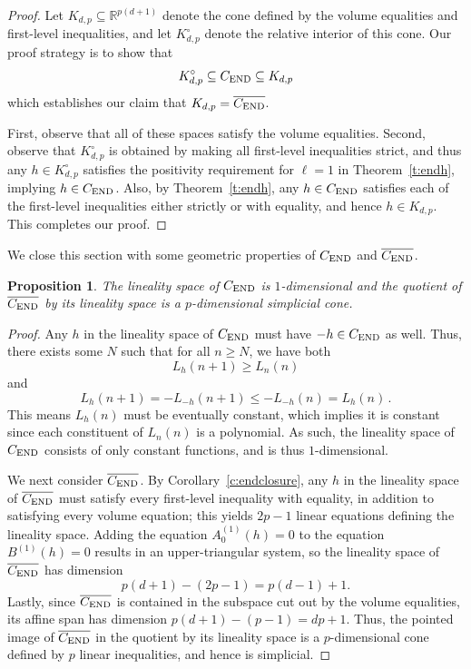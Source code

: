\documentclass[12pt]{amsart}
\newtheorem{prop}[thm]{Proposition}
\theoremstyle{definition}
\numberwithin{equation}{section}
\renewcommand\>{\rangle}
\newcommand\<{\langle}
\newcommand\0{\mathbf{0}}
\newcommand\RR{\mathbb{R}}
\begin{document}
\begin{proof}
Let $K_{d,p} \subseteq \RR^{p(d+1)}$ denote the cone defined by the volume equalities and first-level inequalities, and let $K_{d,p}^\circ$ denote the relative interior of this cone.
Our proof strategy is to show that 
\[
K_{d,p}^\circ \subseteq C_\textnormal{END} \subseteq K_{d,p}
\]
which establishes our claim that $K_{d,p} = \overline{C_\textnormal{END}}$.

First, observe that all of these spaces satisfy the volume equalities.
Second, observe that $K_{d,p}^\circ$ is obtained by making all first-level inequalities strict, and thus any $h\in K_{d,p}^\circ$ satisfies the positivity requirement for $\ell=1$ in Theorem~\ref{t:endh}, implying $h\in C_\textnormal{END}$.
Also, by Theorem~\ref{t:endh}, any $h \in C_\textnormal{END}$ satisfies each of the first-level inequalities either strictly or with equality, and hence $h\in K_{d,p}$.
This completes our proof.
\end{proof}

We close this section with some geometric properties of $C_\textnormal{END}$ and $\overline{C_\textnormal{END}}$.

\begin{prop}\label{prop:linealitydimensions}
The lineality space of $C_\textnormal{END}$ is $1$-dimensional and the quotient of $\overline{C_\textnormal{END}}$ by its lineality space is a $p$-dimensional simplicial cone.
\end{prop}

\begin{proof}
Any $h$ in the lineality space of $C_\textnormal{END}$ must have $-h \in C_\textnormal{END}$ as well.
Thus, there exists some $N$ such that for all $n\geq N$, we have both
\[
L_h(n+1)\geq L_n(n)
\]
and
\[
L_h(n+1)=-L_{-h}(n+1)\leq -L_{-h}(n) = L_{h}(n) \, .
\]
This means $L_h(n)$ must be eventually constant, which implies it is constant since each constituent of $L_n(n)$ is a polynomial.  
As such, the lineality space of $C_\textnormal{END}$ consists of only constant functions, and is thus $1$-dimensional. 

We next consider $\overline{C_\textnormal{END}}$.  
By Corollary~\ref{c:endclosure}, any $h$ in the lineality space of $\overline{C_\textnormal{END}}$ must satisfy every first-level inequality with equality, in addition to satisfying every volume equation; this yields $2p - 1$ linear equations defining the lineality space.  
Adding the equation $A_0^{(1)}(h) = 0$ to the equation $B^{(1)}(h) = 0$ results in an upper-triangular system, so the lineality space of $\overline{C_\textnormal{END}}$ has dimension 
$$p(d+1) - (2p - 1) = p(d-1) + 1.$$
Lastly, since $\overline{C_\textnormal{END}}$ is contained in the subspace cut out by the volume equalities, its affine span has dimension $p(d+1) - (p-1) = dp + 1$.
Thus, the pointed image of $\overline{C_\textnormal{END}}$ in the quotient by its lineality space is a $p$-dimensional cone defined by $p$ linear inequalities, and hence is simplicial.
\end{proof}
\end{document}
